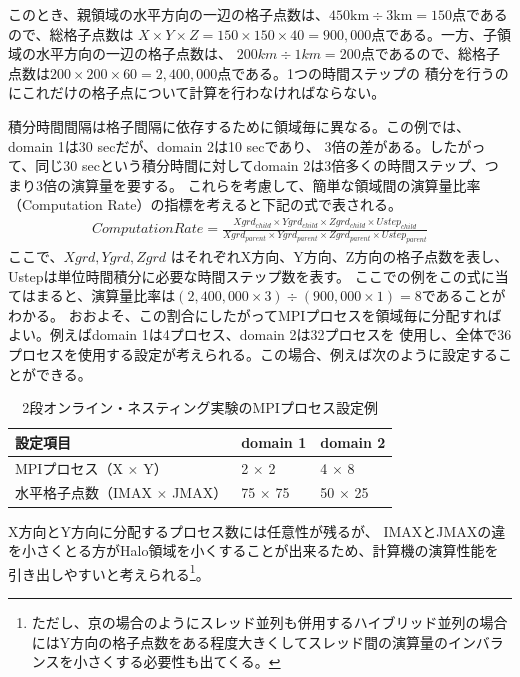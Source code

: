 このとき、親領域の水平方向の一辺の格子点数は、$450 \mathrm{km} \div 3 \mathrm{km} = 150$点であるので、総格子点数は
$X \times Y \times Z = 150 \times 150 \times 40 = 900,000$点である。一方、子領域の水平方向の一辺の格子点数は、
$200 km \div 1 km = 200$点であるので、総格子点数は$200 \times 200 \times 60 = 2,400,000$点である。1つの時間ステップの
積分を行うのにこれだけの格子点について計算を行わなければならない。

積分時間間隔は格子間隔に依存するために領域毎に異なる。この例では、domain 1は30 secだが、domain 2は10 secであり、
3倍の差がある。したがって、同じ30 secという積分時間に対してdomain 2は3倍多くの時間ステップ、つまり3倍の演算量を要する。
これらを考慮して、簡単な領域間の演算量比率（Computation Rate）の指標を考えると下記の式で表される。
\begin{eqnarray}
ComputationRate=\frac{Xgrd_{child} \times Ygrd_{child} \times Zgrd_{child} \times Ustep_{child}}
                     {Xgrd_{parent} \times Ygrd_{parent} \times Zgrd_{parent} \times Ustep_{parent}} \nonumber
\end{eqnarray}
ここで、$Xgrd, Ygrd, Zgrd$ はそれぞれX方向、Y方向、Z方向の格子点数を表し、Ustepは単位時間積分に必要な時間ステップ数を表す。
ここでの例をこの式に当てはまると、演算量比率は$(2,400,000 \times 3) \div (900,000 \times 1) = 8$であることがわかる。
おおよそ、この割合にしたがってMPIプロセスを領域毎に分配すればよい。例えばdomain 1は4プロセス、domain 2は32プロセスを
使用し、全体で36プロセスを使用する設定が考えられる。この場合、例えば次のように設定することができる。

\begin{table}[htb]
\begin{center}
\caption{2段オンライン・ネスティング実験のMPIプロセス設定例}
\begin{tabularx}{150mm}{|l|l|X|} \hline
 \rowcolor[gray]{0.9} 設定項目 & domain 1 & domain 2 \\ \hline
 MPIプロセス（X $\times$ Y） & 2 $\times$ 2 & 4 $\times$ 8 \\ \hline
 水平格子点数（IMAX $\times$ JMAX） & 75 $\times$ 75 & 50 $\times$ 25 \\ \hline
\end{tabularx}
\label{tab:nest_proc_guide2}
\end{center}
\end{table}

X方向とY方向に分配するプロセス数には任意性が残るが、
IMAXとJMAXの違を小さくとる方がHalo領域を小くすることが出来るため、計算機の演算性能を引き出しやすいと考えられる\footnote{ただし、京の場合のようにスレッド並列も併用するハイブリッド並列の場合にはY方向の格子点数をある程度大きくしてスレッド間の演算量のインバランスを小さくする必要性も出てくる。}。

